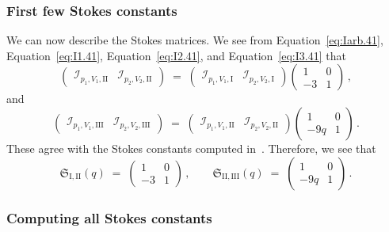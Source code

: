 \documentclass[12pt,reqno]{amsart}
\theoremstyle{definition}
\def\calI{\mathcal I}
\def\be{\begin{equation}}
\def\ee{\end{equation}}
\renewcommand{\=}{\;=\;}
\begin{document}
\subsubsection{First few Stokes constants}
We can now describe the Stokes matrices. We see from Equation~\eqref{eq:Iarb.41}, Equation~\eqref{eq:I1.41}, Equation~\eqref{eq:I2.41}, and Equation~\eqref{eq:I3.41} that
\be
  \begin{pmatrix}
    \calI_{p_1,V_1,\mathrm{II}} & \calI_{p_2,V_2,\mathrm{II}}
  \end{pmatrix}
  \=
  \begin{pmatrix}
    \calI_{p_1,V_1,\mathrm{I}} & \calI_{p_2,V_2,\mathrm{I}}
  \end{pmatrix}
  \begin{pmatrix}
    1 & 0\\
    -3 & 1
  \end{pmatrix}\,,
\ee
and
\be
  \begin{pmatrix}
    \calI_{p_1,V_1,\mathrm{III}} & \calI_{p_2,V_2,\mathrm{III}}
  \end{pmatrix}
  \=
  \begin{pmatrix}
    \calI_{p_1,V_1,\mathrm{II}} & \calI_{p_2,V_2,\mathrm{II}}
  \end{pmatrix}
  \begin{pmatrix}
    1 & 0\\
    -9q & 1
  \end{pmatrix}\,.
\ee
These agree with the Stokes constants computed in~\cite{GGM:I}. Therefore, we see that
\be
  \mathfrak{S}_{\mathrm{I},\mathrm{II}}(q)
  \=
  \begin{pmatrix}
    1 & 0\\
    -3 & 1
  \end{pmatrix}\,,\qquad
  \mathfrak{S}_{\mathrm{II},\mathrm{III}}(q)
  \=
  \begin{pmatrix}
    1 & 0\\
    -9q & 1
  \end{pmatrix}\,.
\ee

\subsubsection{Computing all Stokes constants}
\end{document}
